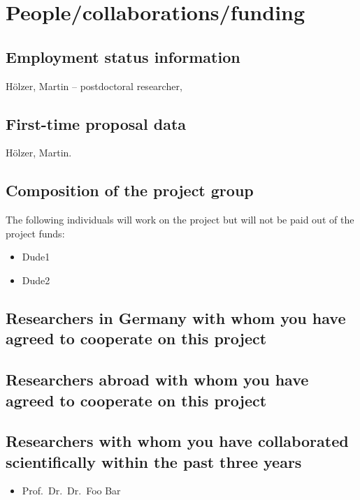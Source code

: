 \documentclass{scrartcl}
\begin{document}
\section{People/collaborations/funding}

\subsection{Employment status information}
H\"olzer, Martin -- postdoctoral researcher, 

\subsection{First-time proposal data}
H\"olzer, Martin.

\subsection{Composition of the project group}
The following individuals will work on the project but will not be paid out of
the project funds:

\begin{itemize}
\item Dude1
\item Dude2
\end{itemize}

\subsection{Researchers in Germany with whom you have agreed to cooperate on this project}

\subsection{Researchers abroad with whom you have agreed to cooperate on this project}

\subsection{Researchers with whom you have collaborated scientifically within the past three years}
\begin{itemize}
  \item Prof.\ Dr.\ Dr.\ Foo Bar
\end{itemize}
\end{document}
